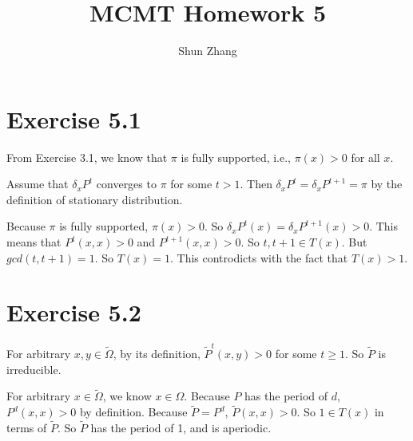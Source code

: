 \documentclass[10pt]{article}
\title{MCMT Homework 5}
\author{Shun Zhang}
\date{}
\begin{document}
\maketitle

\section*{Exercise 5.1}

From Exercise 3.1, we know that $\pi$ is fully supported, i.e., $\pi(x) > 0$
for all $x$.

Assume that $\delta_x P^t$ converges to $\pi$ for some $t > 1$. Then $\delta_x
P^t = \delta_x P^{t+1} = \pi$ by the definition of stationary distribution.

Because $\pi$ is fully supported, $\pi(x) > 0$. So $\delta_x P^t (x) = \delta_x
P^{t+1} (x) > 0$. This means that $P^t(x, x) > 0$ and $P^{t+1}(x, x) > 0$. So
$t, t+1 \in T(x)$. But $gcd(t, t+1) = 1$. So $T(x) = 1$. This controdicts with
the fact that $T(x) > 1$.

\section*{Exercise 5.2}

For arbitrary $x, y \in \tilde{\Omega}$, by its definition, $\tilde{P}^t(x, y) > 0$
for some $t \geq 1$. So $\tilde{P}$ is irreducible.

For arbitrary $x \in \tilde{\Omega}$, we know $x \in \Omega$. Because $P$ has
the period of $d$, $P^d(x, x) > 0$ by definition. Because $\tilde{P} = P^d$,
$\tilde{P}(x, x) > 0$. So $1 \in T(x)$ in terms of $\tilde{P}$. So $\tilde{P}$
has the period of 1, and is aperiodic.
\end{document}
